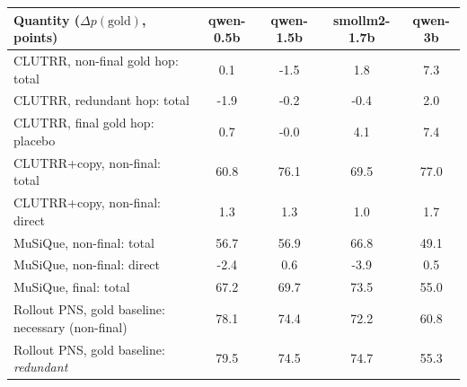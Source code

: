\begin{tabular}{lcccc}
\toprule
Quantity ($\Delta p(\text{gold})$, points) & qwen-0.5b & qwen-1.5b & smollm2-1.7b & qwen-3b \\
\midrule
CLUTRR, non-final gold hop: total & 0.1 & -1.5 & 1.8 & 7.3 \\
CLUTRR, redundant hop: total & -1.9 & -0.2 & -0.4 & 2.0 \\
CLUTRR, final gold hop: placebo & 0.7 & -0.0 & 4.1 & 7.4 \\
CLUTRR+copy, non-final: total & 60.8 & 76.1 & 69.5 & 77.0 \\
CLUTRR+copy, non-final: direct & 1.3 & 1.3 & 1.0 & 1.7 \\
MuSiQue, non-final: total & 56.7 & 56.9 & 66.8 & 49.1 \\
MuSiQue, non-final: direct & -2.4 & 0.6 & -3.9 & 0.5 \\
MuSiQue, final: total & 67.2 & 69.7 & 73.5 & 55.0 \\
Rollout PNS, gold baseline: necessary (non-final) & 78.1 & 74.4 & 72.2 & 60.8 \\
Rollout PNS, gold baseline: \emph{redundant} & 79.5 & 74.5 & 74.7 & 55.3 \\
\bottomrule
\end{tabular}
